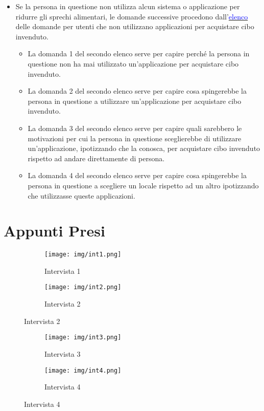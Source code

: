 \documentclass{article}
\begin{document}
\begin{itemize}
\begin{itemize}
    \end{itemize}
    \item Se la persona in questione non utilizza alcun sistema o applicazione per ridurre gli sprechi alimentari, le domande successive procedono dall'\hyperref[dom_non_utilizzatori]{\textcolor{blue}{elenco}} delle domande per utenti che non utilizzano applicazioni per acquistare cibo invenduto.
    \begin{itemize}
        \item La domanda 1 del secondo elenco serve per capire perché la persona in questione non ha mai utilizzato un'applicazione per acquistare cibo invenduto.
        \item La domanda 2 del secondo elenco serve per capire cosa spingerebbe la persona in questione a utilizzare un'applicazione per acquistare cibo invenduto.
        \item La domanda 3 del secondo elenco serve per capire quali sarebbero le motivazioni per cui la persona in questione sceglierebbe di utilizzare un'applicazione, ipotizzando che la conosca, per acquistare cibo invenduto rispetto ad andare direttamente di persona.
        \item La domanda 4 del secondo elenco serve per capire cosa spingerebbe la persona in questione a scegliere un locale rispetto ad un altro ipotizzando che utilizzasse queste applicazioni.
    \end{itemize}
\end{itemize}

\newpage
\section{Appunti Presi}

\begin{figure}[h]
    \centering
    \begin{subfigure}{0.40\textwidth}
        \centering
        \texttt{[image: img/int1.png]}
        \caption{Intervista 1}
    \end{subfigure}
    \hfill
    \begin{subfigure}{0.40\textwidth}
        \centering
        \texttt{[image: img/int2.png]}
        \caption{Intervista 2}
    \end{subfigure}
\end{figure}

\begin{figure}[h]
    \centering
    \begin{subfigure}{0.40\textwidth}
        \centering
        \texttt{[image: img/int3.png]}
        \caption{Intervista 3}
    \end{subfigure}
    \hfill
    \begin{subfigure}{0.40\textwidth}
        \centering
        \texttt{[image: img/int4.png]}
        \caption{Intervista 4}
    \end{subfigure}
\end{figure}
\end{document}
